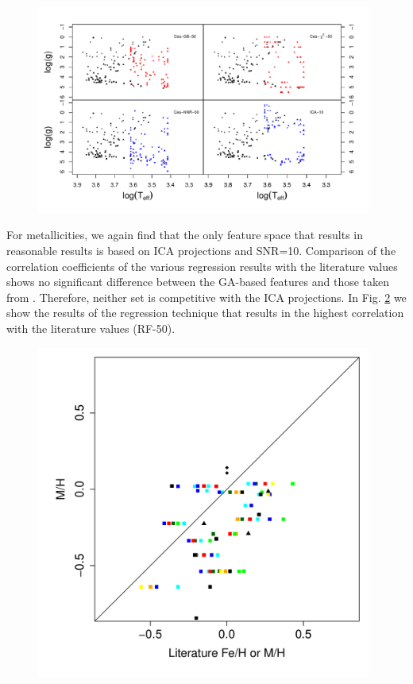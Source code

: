 
\begin {figure}
 \centering
  \includegraphics[width=11cm]{figs/irtf-figs/irtf-Cesseti.pdf}
  \caption{}
 \label{fig:irtf-ces}
\end {figure}
 
 
For metallicities, we again find that the only feature space that
results in reasonable results is based on ICA projections and
SNR=10. Comparison of the correlation coefficients of the various
regression results with the literature values shows no significant
difference between the GA-based features and those taken from
\cite{cesetti}. Therefore, neither set is competitive with the ICA
projections. In Fig. \ref{fig:irtf-ces-met} we show the results of the
regression technique that results in the highest correlation with the
literature values (RF-50).

\begin {figure}
\centering
\includegraphics[width=11cm]{figs/irtf-figs/M-CES.pdf}
\caption{}
\label{fig:irtf-ces-met}
\end {figure}
